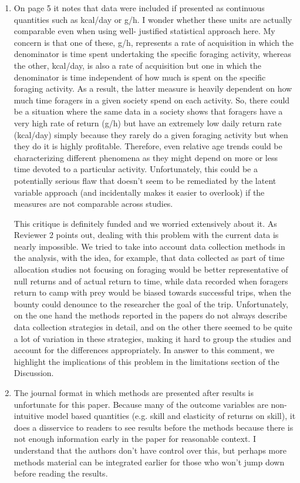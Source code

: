 \documentclass{article}
\newcommand{\rev}[1]{{\color{ForestGreen}#1}}
\begin{document}
\begin{enumerate}
    \item On page 5 it notes that data were included if presented as continuous quantities such as  kcal/day or g/h. I wonder whether these units are actually comparable even when using well- justified statistical approach here. My concern is that one of these, g/h, represents a rate of  acquisition in which the denominator is time spent undertaking the specific foraging activity,  whereas the other, kcal/day, is also a rate of acquisition but one in which the denominator is time  independent of how much is spent on the specific foraging activity. As a result, the latter measure is heavily dependent on how much time foragers in a given society spend on each activity. So, there could be a situation where the same data in a society shows that foragers have a very high  rate of return (g/h) but have an extremely low daily return rate (kcal/day) simply because they  rarely do a given foraging activity but when they do it is highly profitable. Therefore, even relative age trends could be characterizing different phenomena as they might depend on more or less time devoted to a particular activity. Unfortunately, this could be a potentially serious flaw that doesn't seem to be remediated  by the latent variable approach (and incidentally makes it easier to overlook) if the measures are not comparable across studies.
    
\rev{This critique is definitely funded and we worried extensively about it. As Reviewer 2 points out, dealing with this problem with the current data is nearly impossible. We tried to take into account data collection methods in the analysis, with the idea, for example, that data collected as part of time allocation studies not focusing on foraging would be better representative of null returns and of actual return to time, while data recorded when foragers return to camp with prey would be biased towards successful trips, when the bounty could denounce to the researcher the goal of the trip. Unfortunately, on the one hand the methods reported in the papers do not always describe data collection strategies in detail, and on the other there seemed to be quite a lot of variation in these strategies, making it hard to group the studies and account for the differences appropriately. In answer to this comment, we highlight the implications of this problem in the limitations section of the Discussion.}

    \item The journal format in which methods are presented after results is unfortunate for this paper.  Because many of the outcome variables are non-intuitive model based quantities (e.g. skill and  elasticity of returns on skill), it does a disservice to readers to see results before the methods  because there is not enough information early in the paper for reasonable context. I understand  that the authors don't have control over this, but perhaps more methods material can be integrated earlier for those who won’t jump down before reading the results.
    

\end{enumerate}
\end{document}
